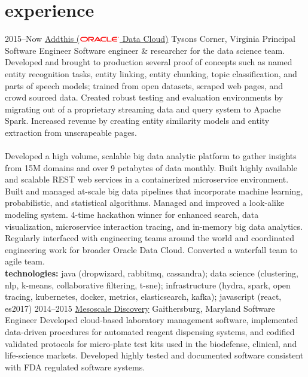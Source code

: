 \documentclass[]{friggeri-cv} %
\begin{document}
\section{experience}
\begin{entrylist}
\entry
{2015--Now}
{\href{https://www.addthis.com/}{Addthis (\includegraphics[width=50pt]{500px-Oracle_logo.svg.png}  Data Cloud)}}
{Tysons Corner, Virginia}
{Principal Software Engineer}
{
	Software engineer \& researcher for the data science team. Developed and brought to production several proof of concepts such as named entity recognition tasks, entity linking, entity chunking, topic classification, and parts of speech models; trained from open datasets, scraped web pages, and crowd sourced data. Created robust testing and evaluation environments by migrating out of a proprietary streaming data and query system to Apache Spark. Increased revenue by creating entity similarity models and entity extraction from unscrapeable pages.\\\\
	Developed a high volume, scalable big data analytic platform to gather insights from 15M domains and over 9 petabytes of data monthly. Built highly available and scalable REST web services in a containerized microservice environment. Built and managed at-scale big data pipelines that incorporate machine learning, probabilistic, and statistical algorithms. Managed and improved a look-alike modeling system. 4-time hackathon winner for enhanced search, data visualization, microservice interaction tracing, and in-memory big data analytics. Regularly interfaced with engineering teams around the world and coordinated engineering work for broader Oracle Data Cloud. Converted a waterfall team to agile team.\\
	\textbf{technologies:} java (dropwizard, rabbitmq, cassandra); data science (clustering, nlp, k-means, collaborative filtering, t-sne); infrastructure (hydra, spark, open tracing, kubernetes, docker, metrics, elasticsearch, kafka); javascript (react, es2017)
}
\entry
{2014--2015}
{\href{https://www.mesoscale.com/}{Mesoscale Discovery}}
{Gaithersburg, Maryland}
{Software Engineer}
{
	Developed cloud-based laboratory management software, implemented data-driven procedures for automated reagent dispensing systems, and codified validated protocols for micro-plate test kits used in the biodefense, clinical, and life-science markets. Developed highly tested and documented software consistent with FDA regulated software systems.\\
}
\end{entrylist}
\end{document}

